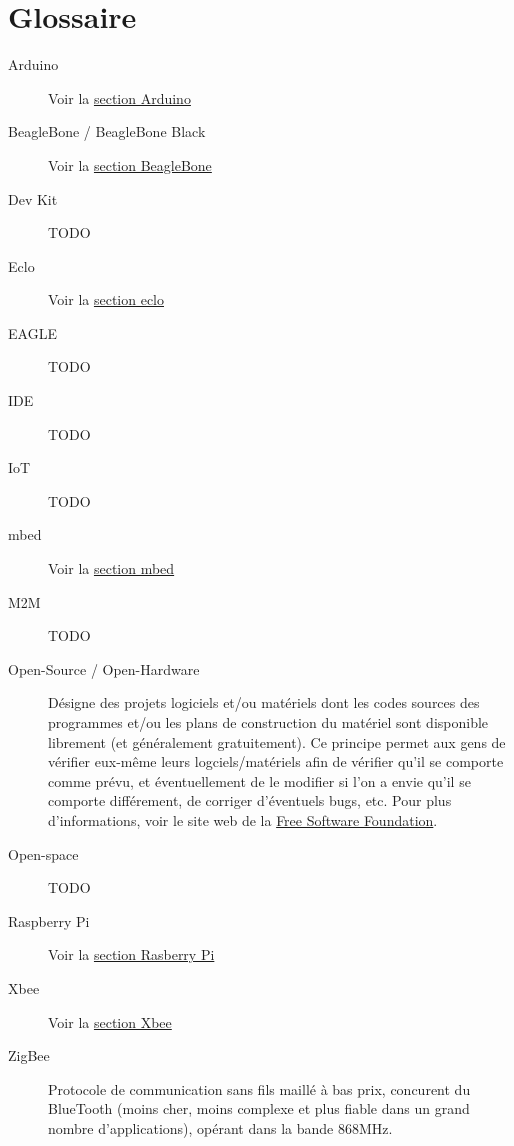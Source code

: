 \documentclass{article}
\begin{document}
\clearpage

\section{Glossaire}
\label{glossaire}

\begin{description}
    \item[Arduino] Voir la \hyperref[arduino]{section Arduino}
    \item[BeagleBone / BeagleBone Black] Voir la \hyperref[bbb]{section BeagleBone}
    \item[Dev Kit] TODO
    \item[Eclo] Voir la \hyperref[eclo]{section eclo}
    \item[EAGLE] TODO
    \item[IDE] TODO
    \item[IoT] TODO
    \item[mbed] Voir la \hyperref[mbed]{section mbed}
    \item[M2M] TODO
    \item[Open-Source / Open-Hardware] Désigne des projets logiciels et/ou matériels dont les codes sources des programmes et/ou les plans de construction du matériel sont disponible librement (et généralement gratuitement). Ce principe permet aux gens de vérifier eux-même leurs logciels/matériels afin de vérifier qu’il se comporte comme prévu, et éventuellement de le modifier si l’on a envie qu’il se comporte différement, de corriger d’éventuels bugs, etc. Pour plus d’informations, voir le site web de la \hyperref[https://www.fsf.org/]{Free Software Foundation}.
    \item[Open-space] TODO
    \item[Raspberry Pi] Voir la \hyperref[rpi]{section Rasberry Pi}
    \item[Xbee] Voir la \hyperref[xbee]{section Xbee}
    \item[ZigBee] Protocole de communication sans fils maillé à bas prix, concurent du BlueTooth (moins cher, moins complexe et plus fiable dans un grand nombre d’applications), opérant dans la bande 868MHz.
\end{description}

\clearpage
\end{document}
